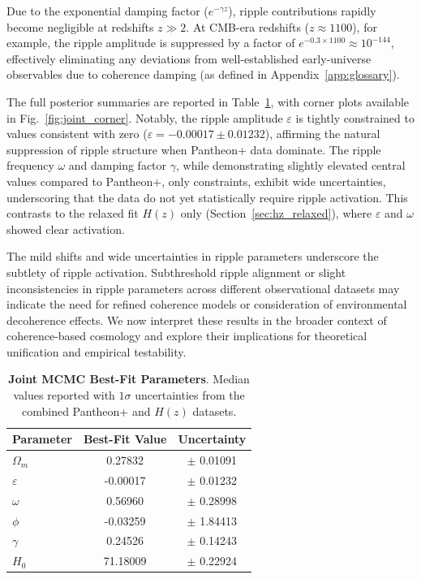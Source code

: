 Due to the exponential damping factor ($e^{-\gamma z}$), ripple contributions rapidly become negligible at redshifts $z \gg 2$. At CMB-era redshifts ($z \approx 1100$), for example, the ripple amplitude is suppressed by a factor of $e^{-0.3 \times 1100} \approx 10^{-144}$, effectively eliminating any deviations from well-established early-universe observables due to coherence damping (as defined in Appendix~\ref{app:glossary}).

The full posterior summaries are reported in Table~\ref{tab:joint_params}, with corner plots available in Fig.~\ref{fig:joint_corner}. Notably, the ripple amplitude $\varepsilon$ is tightly constrained to values consistent with zero ($\varepsilon = -0.00017 \pm 0.01232$), affirming the natural suppression of ripple structure when Pantheon+ data dominate. The ripple frequency $\omega$ and damping factor $\gamma$, while demonstrating slightly elevated central values compared to Pantheon+, only constraints, exhibit wide uncertainties, underscoring that the data do not yet statistically require ripple activation. This contrasts to the relaxed fit $H(z)$ only (Section~\ref{sec:hz_relaxed}), where $\varepsilon$ and $\omega$ showed clear activation.

The mild shifts and wide uncertainties in ripple parameters underscore the subtlety of ripple activation. Subthreshold ripple alignment or slight inconsistencies in ripple parameters across different observational datasets may indicate the need for refined coherence models or consideration of environmental decoherence effects. We now interpret these results in the broader context of coherence-based cosmology and explore their implications for theoretical unification and empirical testability.

\begin{table}[htpb]
\centering
\caption{\textbf{Joint MCMC Best-Fit Parameters}. Median values reported with $1\sigma$ uncertainties from the combined Pantheon+ and $H(z)$ datasets.}
\vspace{0.5em}
\begin{tabular}{lcc}
\hline
\textbf{Parameter} & \textbf{Best-Fit Value} & \textbf{Uncertainty} \\
\hline
$\Omega_m$   & 0.27832  & $\pm$ 0.01091 \\
$\varepsilon$ & -0.00017 & $\pm$ 0.01232 \\
$\omega$      & 0.56960  & $\pm$ 0.28998 \\
$\phi$        & -0.03259 & $\pm$ 1.84413 \\
$\gamma$      & 0.24526  & $\pm$ 0.14243 \\
$H_0$         & 71.18009 & $\pm$ 0.22924 \\
\hline
\end{tabular}
\label{tab:joint_params}
\end{table}

